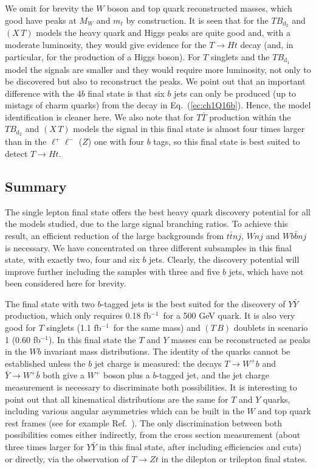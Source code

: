 \documentclass[12pt,a4paper]{article}
\newcommand{\fbin}{fb$^{-1}$}
\newcommand{\TT}{T \bar T}
\newcommand{\YY}{Y \bar Y}
\newcommand{\TBd}{TB_{\text{d}_1}}
\newcommand{\TBD}{TB_{\text{d}_2}}
\newcommand{\TB}{(T \, B)}
\newcommand{\XT}{(X \, T)}
\begin{document}
%
We omit for brevity the $W$ boson and top quark reconstructed masses, which good have peaks at $M_W$ and $m_t$ by construction. It is seen that for the $\TBD$ and $\XT$ models the heavy quark and Higgs peaks are quite good and, with a moderate luminosity, they would give evidence for the $T \to Ht$ decay (and, in particular, for the production of a Higgs boson). For $T$ singlets and the $\TBd$ model the signals are smaller and they would require more luminosity, not only to be discovered but also to reconstruct the peaks.
We point out that an important difference with the $4b$ final state is that six $b$ jets can only be produced (up to mistags of charm quarks) from the decay in Eq.~(\ref{ec:ch1Q16b}). Hence, the model identification is cleaner here. We also note that for $\TT$ production within the $\TBD$ and $\XT$ models the signal in this final state is almost four times larger than in the $\ell^+ \ell^-$ ($Z$) one with four $b$ tags, so this final state is best suited to detect $T \to Ht$.




\subsection{Summary}

The single lepton final state offers the best heavy quark discovery potential for all the models studied, due to the large signal branching ratios. To achieve this result, an efficient reduction of the large backgrounds from $t \bar t nj$, $Wnj$ and $W b \bar b nj$ is necessary. We have concentrated on three different subsamples in this final state, with exactly two, four and six $b$ jets. Clearly, the discovery potential will improve further including the samples with three and five $b$ jets, which have not been considered here for brevity.

The final state with two $b$-tagged jets is the best suited for the discovery of $\YY$ production, which only requires 0.18 \fbin\ for a 500 GeV quark. It is also very good for $T$ singlets (1.1 \fbin\ for the same mass) and $\TB$ doublets in scenario 1 (0.60 \fbin). In this final state the $T$ and $Y$ masses can be reconstructed as peaks in the $Wb$ invariant mass distributions. The identity of the quarks cannot be established unless the $b$ jet charge is measured: the decays $T \to W^+ b$ and $\bar Y \to W^+ \bar b$ both give a $W^+$ boson plus a $b$-tagged jet, and the jet charge measurement is necessary to discriminate both possibilities. It is interesting to point out that all kinematical distributions are the same for $T$ and $Y$ quarks, including various angular asymmetries which can be built in the $W$ and top quark rest frames (see for example Ref.~\cite{AguilarSaavedra:2006fy}). The only discrimination between both possibilities comes either indirectly, from the cross section measurement (about three times larger for $\YY$ in this final state, after including efficiencies and cuts) or directly, via the observation of $T \to Zt$ in the dilepton or trilepton final states.
\end{document}
